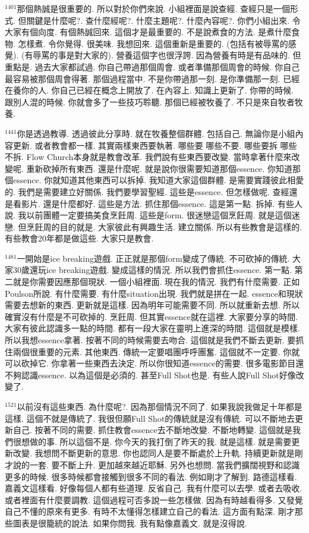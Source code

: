 \documentclass{book}
\begin{document}
$^{1401}$那個熱誠是很重要的.
所以對於你們來說.
小組裡面是說查經.
查經只是一個形式.
但關鍵是什麼呢?.
查什麼經呢?.
什麼主題呢?.
什麼內容呢?.
你們小組出來.
令大家有個向度.
有個熱誠回來.
這個才是最重要的.
不是說煮食的方法.
是煮什麼食物.
怎樣煮.
令你覺得.
很美味.
我想回來.
這個重新是重要的.
(包括有被辱罵的感覺).
(有辱罵的事是對大家的).
營養這個字也很浮誇.
因為營養有時是有品味的.
但重點是.
過去大家都試過.
你自己帶過那個周會.
或者準備那個周會的時候.
你自己最容易被那個周會得著.
那個過程當中.
不是你帶過那一刻.
是你準備那一刻.
已經在養你的人.
你自己已經在概念上開放了.
在內容上.
知識上更新了.
你帶的時候.
跟別人混的時候.
你就會多了一些技巧聆聽.
那個已經被牧養了.
不只是來自牧者牧養.

$^{1441}$你是透過教導.
透過彼此分享時.
就在牧養整個群體.
包括自己.
無論你是小組內容更新.
或者教會都一樣.
其實兩樣東西要執著.
哪些要 哪些不要.
哪些要拆 哪些不拆.
Flow Church本身就是教會改革.
我們說有些東西要改變.
當時拿著什麼來改變呢.
重新砍掉所有東西.
還是什麼呢.
就是說你很需要知道那個essence.
你知道那個essence.
你就知道其他東西可以拆掉.
我知道大家這個群體.
是需要實踐彼此相愛的.
我們是需要建立好關係.
我們要學習聖經.
這些是essence.
但怎樣做呢.
查經還是看影片.
還是什麼都好.
這些是方法.
抓住那個essence.
這是第一點.
拆掉.
有些人說.
我以前團體一定要搞美食烹飪周.
這些是form.
很迷戀這個烹飪周.
就是這個迷戀.
但烹飪周的目的就是.
大家彼此有興趣生活.
建立關係.
所以有些教會是這樣的.
有些教會20年都是做這些.
大家只是教會.

$^{1481}$一開始是ice breaking遊戲.
正正就是那個form變成了傳統.
不可砍掉的傳統.
大家30歲還玩ice breaking遊戲.
變成這樣的情況.
所以我們會抓住essence.
第一點.
第二就是你需要因應那個現狀.
一個小組裡面.
現在我的情況.
我們有什麼需要.
正如Poulson所說.
有什麼需要.
有什麼situation出現.
我們就是拼在一起.
essence和現狀需要去想新的東西.
更新就是這樣.
因為明年可能需要不同.
所以就重新去想.
所以確實沒有什麼是不可砍掉的.
烹飪周.
但其實essence就在這裡.
大家要分享的時間.
大家有彼此認識多一點的時間.
都有一段大家在靈明上進深的時間.
這個就是模樣.
所以我想essence拿著.
按著不同的時候需要去吻合.
這個就是我們不斷去更新.
要抓住兩個很重要的元素.
其他東西.
傳統一定要唱團呼呼團奮.
這個就不一定要.
你就可以砍掉它.
你拿著一些東西去決定.
所以你很知道essence的需要.
很多電影節目還不夠認識essence.
以為這個是必須的.
甚至Full Shot也是.
有些人說Full Shot好像改變了.

$^{1521}$以前沒有這些東西.
為什麼呢?.
因為那個情況不同了.
如果我說我做足十年都是這樣.
這個不就是傳統了.
我很但願Full Shot的傳統就是沒有傳統.
可以不斷地去更新自己.
按著不同的需要.
抓住教會essence去不斷地改變.
不斷地轉變.
這個就是我們很想做的事.
所以這個不是.
你今天的我打倒了昨天的我.
就是這樣.
就是需要更新改變.
我想問不斷更新的意思.
你也認同人是要不斷處於上升軌.
持續更新就是剛才說的一套.
要不斷上升.
更加越來越近耶穌.
另外也想問.
當我們擴闊視野和認識更多的時候.
很多時候都會接觸到很多不同的看法.
例如剛才了解到.
路德這樣看.
嘉義文這樣看.
好像每個人都有些道理.
反省自己.
我有什麼可以去學.
或者去吸收.
或者裡面有什麼要調教.
這個過程可否多說一些怎樣做.
因為有時越看得多.
又發覺自己不懂的原來有更多.
有時不太懂得怎樣建立自己的看法.
這方面有點深.
剛才那些圖表是很籠統的說法.
如果你問我.
我有點像嘉義文.
就是沒得說.
\end{document}
